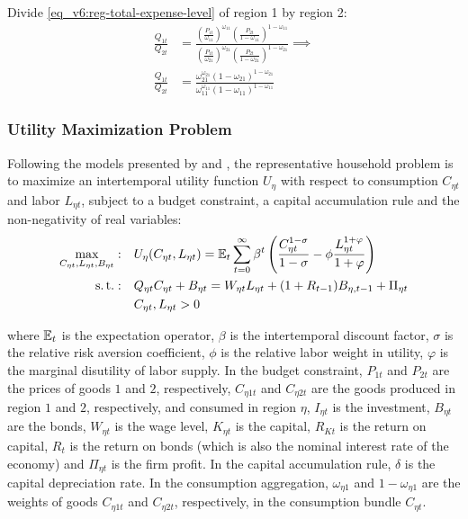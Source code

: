 \documentclass[../thesis.tex]{subfiles}
\begin{document}
	Divide \ref{eq_v6:reg-total-expense-level} of region 1 by region 2:
	\begin{align}
		\frac{Q_{1t}}{Q_{2t}} &= \frac{\left( \frac{P_{1 t}}{\omega_{11}} \right)^{\omega_{11}} \left( \frac{P_{2 t}}{1 -\omega_{11}} \right)^{1 -\omega_{11}}}{\left( \frac{P_{1 t}}{\omega_{21}} \right)^{\omega_{21}} \left( \frac{P_{2 t}}{1 -\omega_{21}} \right)^{1 -\omega_{21}}} \implies \nonumber \\
		\frac{Q_{1t}}{Q_{2t}} &= \frac{\omega_{21}^{\omega_{21}} (1 -\omega_{21})^{1 -\omega_{21}}}{\omega_{11}^{\omega_{11}} (1 - \omega_{11})^{1 - \omega_{11}}} \label{eq_v6:reg-total-expense-level-2}
	\end{align}

\subsubsection*{Utility Maximization Problem}

	Following the models presented by \textcite{costa_junior_understanding_2016} and \textcite{solis-garcia_ucb_2022}, the representative household problem is to maximize an intertemporal utility function $U_{\eta}$ with respect to consumption $C_{\eta t}$ and labor $L_{\eta t}$, subject to a budget constraint, a capital accumulation rule and the non-negativity of real variables:
	\begin{align}
		\max_{C_{\eta t}, L_{\eta t}, B_{\eta t}}: &\quad U_{\eta}(C_{\eta t},L_{\eta t}) = {\mathbb{E}_{t}} \sum_{t=0}^{\infty} \beta^t \left(\frac{C_{\eta t}^{1-\sigma}}{1-\sigma} - \phi \frac{L_{\eta t}^{1+\varphi}}{1+\varphi} \right) \label{eq_v6:reg-utility-function} 
		\\
		\operatorname{s.t.}: &\quad Q_{\eta t} C_{\eta t} + B_{\eta t} = W_{\eta t} L_{\eta t} + (1 + R_{t-1}) B_{\eta,t-1} + \Pi_{\eta t} \label{eq_v6:reg-budget-constraint} \\
		&\quad C_{\eta t}, L_{\eta t} > 0 \nonumber
	\end{align}

	where ${\mathbb{E}_{t}}$ is the expectation operator, $\beta$ is the intertemporal discount factor, $\sigma$ is the relative risk aversion coefficient, $\phi$ is the relative labor weight in utility, $\varphi$ is the marginal disutility of labor supply. In the budget constraint, $P_{1t}$ and $P_{2t}$ are the prices of goods $1$ and $2$, respectively, $C_{\eta 1 t}$ and $C_{\eta 2 t}$ are the goods produced in region $1$ and $2$, respectively, and consumed in region $\eta$, $I_{\eta t}$ is the investment, $B_{\eta t}$ are the bonds, $W_{\eta t}$ is the wage level, $K_{\eta t}$ is the capital, $R_{Kt}$ is the return on capital, $R_t$ is the return on bonds (which is also the nominal interest rate of the economy) and $\Pi_{\eta t}$ is the firm profit. In the capital accumulation rule, $\delta$ is the capital depreciation rate. In the consumption aggregation, ${\omega_{\eta 1}}$ and ${1 - \omega_{\eta 1}}$ are the weights of goods $C_{\eta 1 t}$ and $C_{\eta 2 t}$, respectively, in the consumption bundle $C_{\eta t}$.
\end{document}
